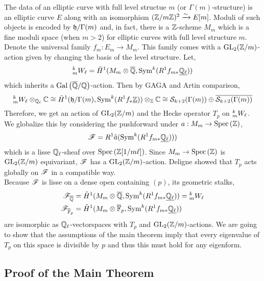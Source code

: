 \documentclass[12pt]{article}
\renewcommand{\C}{\mathbb{C}}
\begin{document}
The data of an elliptic curve with full level structue $m$ (or $\Gamma(m)$-structure) is an elliptic curve $E$ along with an isomorphism $(\mathbb{Z} / m \mathbb{Z})^2 \xrightarrow{\sim} E[m]$. Moduli of such objects is encoded by $\mathfrak{h} / \Gamma(m)$ and, in fact, there is a $\mathbb{Z}$-scheme $M_m$ which is a fine moduli space (when $m > 2$) for elliptic curves with full level structure $m$. Denote the universal family $f_m : E_m \to M_m$. This family comes with a $\mathrm{GL}_{2}(\mathbb{Z}/m)$-action given by changing the basis of the level structure. Let,
\[ {}^{k}_{m} W_\ell = \tilde{H}^1(M_m \otimes \overline{\mathbb{Q}}, \mathrm{Sym}^k (R^1 f_{m*} \underline{\mathbb{Q}_\ell})) \]
which inherits a $\mathrm{Gal}\left( \overline{\mathbb{Q}}/\mathbb{Q} \right)$-action. Then by GAGA and Artin comparison,
\[ \W{k}{m} \otimes_{\Q_\ell} \C \cong \tilde{H}^1(\h / \Gamma(m), \Sym^k(R^1 f_{*} \underline{\Z})) \otimes_\Z \C \cong \S_{k+2}(\Gamma(m)) \oplus \overline{\S_{k+2}(\Gamma(m))} \]
Therefore, we get an action of $\mathrm{GL}_{2}(\mathbb{Z}/m)$ and the Hecke operator $T_p$ on ${}^{k}_{m} W_\ell$.
We globalize this by considering the pushforward under $a : M_m \to \mathrm{Spec}\left( \mathbb{Z} \right)$,
\[ \mathscr{F} = R^1 \tilde{a} (\mathrm{Sym}^k(R^1 f_{m*} \underline{\mathbb{Q}_\ell}))) \]
which is a lisse $\mathbb{Q}_\ell$-sheaf over $\mathrm{Spec}\left( \mathbb{Z}[1/m\ell] \right)$. Since $M_m \to \mathrm{Spec}\left( \mathbb{Z} \right)$ is $\mathrm{GL}_{2}(\mathbb{Z}/m)$ equivariant, $\mathscr{F}$ has a $\mathrm{GL}_{2}(\mathbb{Z}/m)$-action. Deligne showed that $T_p$ acts globally on $\mathscr{F}$ in a compatible way.
\bigskip\\
Because $\mathscr{F}$ is lisse on a dense open containing $(p)$, its geometric stalks,
\begin{align*}
\mathscr{F}_{\overline{\mathbb{Q}}} & = \tilde{H}^1(M_m \otimes \overline{\mathbb{Q}}, \mathrm{Sym}^k (R^1 f_{m*} \underline{\mathbb{Q}_\ell})) = {}^{k}_{m} W_\ell
\\
\mathscr{F}_{\overline{\mathbb{F}}_p} & = \tilde{H}^1(M_m \otimes \overline{\mathbb{F}}_p, \mathrm{Sym}^k (R^1 f_{m*} \underline{\mathbb{Q}_\ell}))
\end{align*} 
are isomorphic as $\mathbb{Q}_{\ell}$-vectorspaces with $T_p$ and $\mathrm{GL}_{2}(\mathbb{Z}/m)$-actions. We are going to show that the assumptions of the main theorem imply that every eigenvalue of $T_p$ on this space is divisible by $p$ and thus this must hold for any eigenform. 

\subsection{Proof of the Main Theorem}
\end{document}
